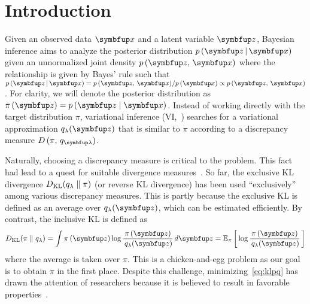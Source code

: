 
\section{Introduction}
Given an observed data \(\vx\) and a latent variable \(\vz\), Bayesian inference aims to analyze the posterior distribution \(p\,(\vz\,|\,\vx)\) given an unnormalized joint density \(p\,(\vz,\,\vx)\) where the relationship is given by Bayes' rule such that \(p\,(\vz\,|\,\vx) = {p\,(\vz,\,\vx)}/{p\,(\vx)} \propto p\,(\vz,\,\vx)\).
For clarity, we will denote the posterior distribution as \(\pi\left(\vz\right) = p\,(\vz\mid\vx)\).
Instead of working directly with the target distribution \(\pi\), variational inference (VI,~\citealt{blei_variational_2017}) searches for a variational approximation \(q_{\lambda}(\vz)\) that is similar to \(\pi\) according to a discrepancy measure \(D\,(\pi,\, q_{\vlambda})\).

Naturally, choosing a discrepancy measure is critical to the problem.
This fact had lead to a quest for suitable divergence measures~\citep{pmlr-v37-salimans15, NIPS2016_7750ca35, NIPS2017_35464c84, NEURIPS2018_1cd138d0, pmlr-v97-ruiz19a}.
So far, the exclusive KL divergence \(D_{\mathrm{KL}}(q_{\lambda}\parallel\pi)\) (or reverse KL divergence) has been used ``exclusively'' among various discrepancy measures.
This is partly because the exclusive KL is defined as an average over \(q_{\lambda}(\vz)\), which can be estimated efficiently.
By contrast, the inclusive KL is defined as
%
{\small
\vspace{-0.05in}
\begin{align}
  \DKL{\pi}{q_{\lambda}}
  = \int \pi\,(\vz) \log \frac{\pi\left(\vz\right)}{\,q_{\lambda}(\vz)} \,d\vz
  = \Esub{\pi}{\log \frac{\pi\left(\vz\right)}{\,q_{\lambda}(\vz)} } \label{eq:klpq}
\end{align}
}%
%
where the average is taken over \(\pi\). 
This is a chicken-and-egg problem as our goal is to obtain \(\pi\) in the first place.
Despite this challenge, minimizing~\eqref{eq:klpq} has drawn the attention of researchers because it is believed to result in favorable properties~\citep{minka2005divergence, mackay_local_2001}.

